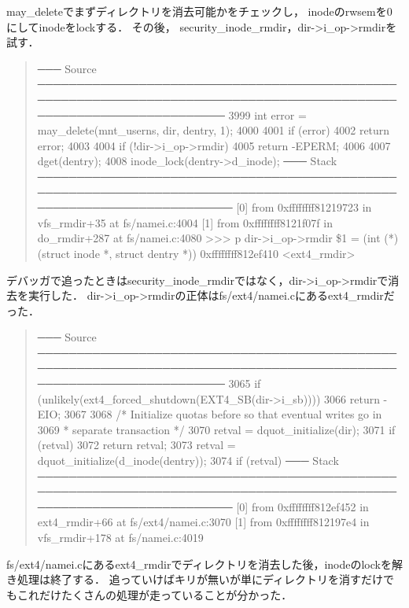 may_deleteでまずディレクトリを消去可能かをチェックし，
inodeのrwsemを0にしてinodeをlockする．
その後， security_inode_rmdir，dir->i_op->rmdirを試す．
\begin{quote}
    ─── Source ────────────────────────────────────────────────────────────────────────────────────────────────────────────────────
 3999      int error = may_delete(mnt_userns, dir, dentry, 1);
 4000
 4001      if (error)
 4002          return error;
 4003
 4004      if (!dir->i_op->rmdir)
 4005          return -EPERM;
 4006
 4007      dget(dentry);
 4008      inode_lock(dentry->d_inode);
─── Stack ─────────────────────────────────────────────────────────────────────────────────────────────────────────────────────
[0] from 0xffffffff81219723 in vfs_rmdir+35 at fs/namei.c:4004
[1] from 0xffffffff8121f07f in do_rmdir+287 at fs/namei.c:4080
>>> p dir->i_op->rmdir
\$1 = (int (*)(struct inode *, struct dentry *)) 0xffffffff812ef410 <ext4_rmdir>
\end{quote}
デバッガで追ったときはsecurity_inode_rmdirではなく，dir->i_op->rmdirで消去を実行した．
dir->i_op->rmdirの正体はfs/ext4/namei.cにあるext4_rmdirだった．
\begin{quote}
─── Source ────────────────────────────────────────────────────────────────────────────────────────────────────────────────────
 3065      if (unlikely(ext4_forced_shutdown(EXT4_SB(dir->i_sb))))
 3066          return -EIO;
 3067
 3068      /* Initialize quotas before so that eventual writes go in
 3069       * separate transaction */
 3070      retval = dquot_initialize(dir);
 3071      if (retval)
 3072          return retval;
 3073      retval = dquot_initialize(d_inode(dentry));
 3074      if (retval)
─── Stack ─────────────────────────────────────────────────────────────────────────────────────────────────────────────────────
[0] from 0xffffffff812ef452 in ext4_rmdir+66 at fs/ext4/namei.c:3070
[1] from 0xffffffff812197e4 in vfs_rmdir+178 at fs/namei.c:4019
\end{quote}

fs/ext4/namei.cにあるext4_rmdirでディレクトリを消去した後，inodeのlockを解き処理は終了する．
追っていけばキリが無いが単にディレクトリを消すだけでもこれだけたくさんの処理が走っていることが分かった．

